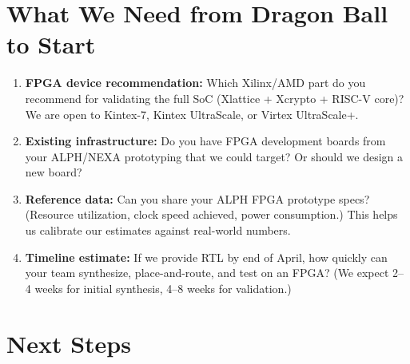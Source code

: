 \documentclass[11pt,a4paper]{article}
\begin{document}
\section{What We Need from Dragon Ball to Start}

\begin{enumerate}[leftmargin=1.5em]
    \item \textbf{FPGA device recommendation:} Which Xilinx/AMD part do you recommend for validating the full SoC (Xlattice + Xcrypto + RISC-V core)? We are open to Kintex-7, Kintex UltraScale, or Virtex UltraScale+.

    \item \textbf{Existing infrastructure:} Do you have FPGA development boards from your ALPH/NEXA prototyping that we could target? Or should we design a new board?

    \item \textbf{Reference data:} Can you share your ALPH FPGA prototype specs? (Resource utilization, clock speed achieved, power consumption.) This helps us calibrate our estimates against real-world numbers.

    \item \textbf{Timeline estimate:} If we provide RTL by end of April, how quickly can your team synthesize, place-and-route, and test on an FPGA? (We expect 2--4 weeks for initial synthesis, 4--8 weeks for validation.)
\end{enumerate}

\section{Next Steps}
\end{document}
